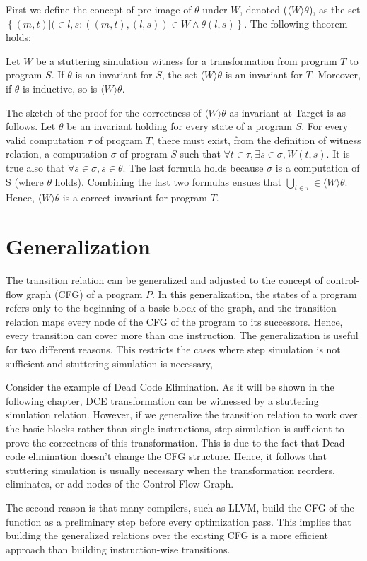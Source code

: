 First we define the concept of pre-image of $\theta$ under $W$, denoted ($\langle W \rangle \theta$), as the set $\left\{(m,t) | (\in l,s : ((m,t),(l,s)) \in W \land \theta(l,s)\right\}$. The following theorem holds:

\begin{ftheorem}
\label{thm:propagation}
Let $W$ be a stuttering simulation witness for a transformation from program $T$ to program $S$. If $\theta$ is an invariant for $S$, the set $\langle W \rangle \theta$ is an invariant for $T$. Moreover, if $\theta$ is inductive, so is $\langle W \rangle \theta$.
\end{ftheorem}
The sketch of the proof for the correctness of  $\langle W \rangle \theta$ as invariant at Target is as follows. Let $\theta$ be an invariant holding for every state of a program $S$. For every valid computation $\tau$ of program $T$, there must exist, from the definition of witness relation, a computation $\sigma$ of program $S$ such that $\forall t \in \tau, \exists s \in \sigma, W(t, s)$. It is true also that $\forall s \in \sigma, s \in \theta$. The last formula holds because $\sigma$ is a computation of S (where $\theta$ holds). Combining the last two formulas ensues that $\underset{t \in \tau}{\bigcup} \in \langle W \rangle \theta$. Hence, $\langle W \rangle \theta$ is a correct invariant for program $T$.

\section{Generalization}
\label{sec:generalization}
The transition relation can be generalized and adjusted to the concept of control-flow graph (CFG) of a program $P$. In this generalization, the states of a program refers only to the beginning of a basic block of the graph, and the transition relation maps every node of the CFG of the program to its successors. Hence, every transition can cover more than one instruction. The generalization is useful for two different reasons. This restricts the cases where step simulation is not sufficient and stuttering simulation is necessary,

Consider the example of Dead Code Elimination. As it will be shown in the following chapter, DCE transformation can be witnessed by a stuttering simulation relation. However, if we generalize the transition relation to work over the basic blocks rather than single instructions, step simulation is sufficient to prove the correctness of this transformation. This is due to the fact that Dead code elimination doesn't change the CFG structure. Hence, it follows that stuttering simulation is usually necessary when the transformation reorders, eliminates, or add nodes of the Control Flow Graph.

The second reason is that many compilers, such as LLVM, build the CFG of the function as a preliminary step before every optimization pass. This implies that building the generalized relations over the existing CFG is a more efficient approach than building instruction-wise transitions.
